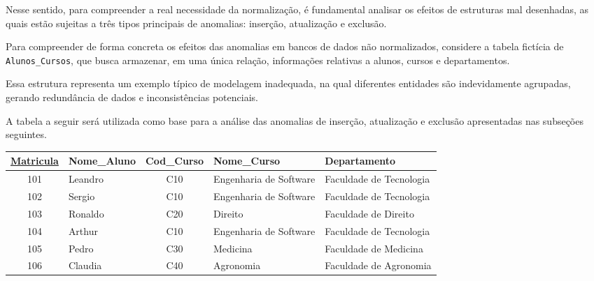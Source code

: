 Nesse sentido, para compreender a real necessidade da normalização, é fundamental analisar os efeitos de estruturas mal desenhadas, as quais estão sujeitas a três tipos principais de anomalias: inserção, atualização e exclusão.\cite{ramakrishnan2011}

\begin{tcolorbox}[breakable, colback=blue!5,colframe=blue!40!black,title=Situação base para análise]

    Para compreender de forma concreta os efeitos das anomalias em bancos de dados não normalizados, considere a tabela fictícia de \texttt{Alunos\_Cursos}, que busca armazenar, em uma única relação, informações relativas a alunos, cursos e departamentos.

    Essa estrutura representa um exemplo típico de modelagem inadequada, na qual diferentes entidades são indevidamente agrupadas, gerando redundância de dados e inconsistências potenciais.

    A tabela a seguir será utilizada como base para a análise das anomalias de inserção, atualização e exclusão apresentadas nas subseções seguintes.

    \vspace{0.4cm}

    \centering
    \renewcommand{\arraystretch}{1.2}

    \begin{adjustbox}{max width=\textwidth}
    \begin{tabular}{|c|l|c|l|l|}
    \hline
    \textbf{\underline{Matricula}} & \textbf{Nome\_Aluno} & \textbf{Cod\_Curso} & \textbf{Nome\_Curso} & \textbf{Departamento} \\ \hline
    101 & Leandro & C10 & Engenharia de Software & Faculdade de Tecnologia \\ \hline
    102 & Sergio & C10 & Engenharia de Software & Faculdade de Tecnologia\\ \hline
    103 & Ronaldo & C20 & Direito & Faculdade de Direito \\ \hline
    104 & Arthur & C10 & Engenharia de Software & Faculdade de Tecnologia \\ \hline
    105 & Pedro & C30 & Medicina & Faculdade de Medicina \\ \hline
    106 & Claudia & C40 & Agronomia & Faculdade de Agronomia \\ \hline
    \end{tabular}
\end{adjustbox}
    \vspace{0.3cm}
    \label{tab:anomalia_exemplo}

\end{tcolorbox}


